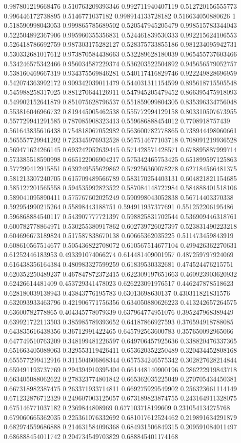 \begin{table}
\begin{tabu}
\begin{sparkline}{10}
0.987801219668476 0.510763209393346 0.992711940407119 0.512720156555773 0.996446172738895 0.5146771037182 0.998914133728182 0.516634050880626 1 0.518590998043053 0.999865785689502 0.520547945205479 0.998515783344043 0.522504892367906 0.995960355356831 0.524461839530333 0.992215624106553 0.526418786692759 0.987303175282127 0.528375733855186 0.981234095942731 0.530332681017612 0.973870584438663 0.532289628180039 0.965455737603466 0.534246575342466 0.956034587229374 0.536203522504892 0.945656579052757 0.538160469667319 0.934375569846281 0.540117416829746 0.922249828696959 0.542074363992172 0.909342039011479 0.544031311154599 0.895618715505548 0.545988258317025 0.881270644126911 0.547945205479452 0.866395475918093 0.549902152641879 0.851075628796537 0.551859099804305 0.835396334756048 0.553816046966732 0.819445005462538 0.555772994129158 0.803310507673955 0.557729941291585 0.787085908323413 0.559686888454012 0.7708918757439 0.561643835616438 0.754818067052982 0.563600782778865 0.738944498060661 0.565557729941292 0.723345976932528 0.567514677103718 0.708091219936528 0.569471624266145 0.693242052639445 0.571428571428571 0.678895887999714 0.573385518590998 0.665122006904217 0.575342465753425 0.651899597125863 0.577299412915851 0.639249555629862 0.579256360078278 0.627184566481375 0.581213307240705 0.615709489566789 0.583170254403131 0.604821821154685 0.585127201565558 0.594535992823522 0.587084148727984 0.584888401518106 0.589041095890411 0.575767602025249 0.590998043052838 0.56714403370338 0.592954990215264 0.55898443188751 0.594911937377691 0.551252206195486 0.596868884540117 0.543907777721397 0.598825831702544 0.536909446318761 0.600782778864971 0.530255380917862 0.602739726027397 0.523831490223218 0.604696673189824 0.517587838670138 0.60665362035225 0.511473459843919 0.608610567514677 0.505436822708072 0.610567514677104 0.499426362270631 0.61252446183953 0.493391074066274 0.614481409001957 0.487259797924069 0.616438356164384 0.480983327599259 0.61839530332681 0.474524476215751 0.620352250489237 0.467847872372415 0.622309197651663 0.460923903620932 0.62426614481409 0.453729341478023 0.626223091976517 0.446247878518623 0.628180039138943 0.43843776195783 0.63013698630137 0.430311821831576 0.632093933463796 0.421906771756356 0.634050880626223 0.413242657264575 0.63600782778865 0.404345778079339 0.637964774951076 0.395247968389449 0.639921722113503 0.385985789393652 0.64187866927593 0.376594918788085 0.643835616438356 0.36712991422465 0.645792563600783 0.357650092965066 0.647749510763209 0.348199481226597 0.649706457925636 0.338820476337365 0.651663405088063 0.329553119426411 0.653620352250489 0.320434452808168 0.655577299412916 0.311504606868344 0.657534246575342 0.302827628214844 0.659491193737769 0.294394910395404 0.661448140900196 0.286222919843718 0.663405088062622 0.278323774801842 0.665362035225049 0.270705434450381 0.667318982387475 0.263371933714811 0.669275929549902 0.256323661114149 0.671232876712329 0.249607003125057 0.673189823874755 0.243164911328075 0.675146771037182 0.2369844808969 0.677103718199609 0.231054134275768 0.679060665362035 0.225361076332692 0.681017612524462 0.219891634291879 0.682974559686888 0.214631584096368 0.684931506849315 0.209591084011497 0.686888454011742 0.204734549703829 0.688845401174168 
\end{sparkline}
\end{tabu}
\end{table}
